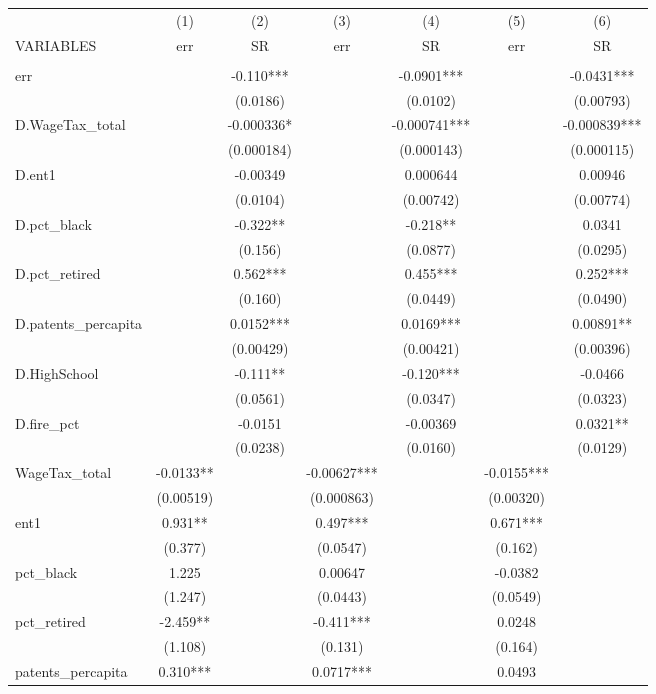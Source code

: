 \begin{tabular}{lcccccc} \hline
 & (1) & (2) & (3) & (4) & (5) & (6) \\
VARIABLES & err & SR & err & SR & err & SR \\ \hline
 &  &  &  &  &  &  \\
err &  & -0.110*** &  & -0.0901*** &  & -0.0431*** \\
 &  & (0.0186) &  & (0.0102) &  & (0.00793) \\
D.WageTax\_total &  & -0.000336* &  & -0.000741*** &  & -0.000839*** \\
 &  & (0.000184) &  & (0.000143) &  & (0.000115) \\
D.ent1 &  & -0.00349 &  & 0.000644 &  & 0.00946 \\
 &  & (0.0104) &  & (0.00742) &  & (0.00774) \\
D.pct\_black &  & -0.322** &  & -0.218** &  & 0.0341 \\
 &  & (0.156) &  & (0.0877) &  & (0.0295) \\
D.pct\_retired &  & 0.562*** &  & 0.455*** &  & 0.252*** \\
 &  & (0.160) &  & (0.0449) &  & (0.0490) \\
D.patents\_percapita &  & 0.0152*** &  & 0.0169*** &  & 0.00891** \\
 &  & (0.00429) &  & (0.00421) &  & (0.00396) \\
D.HighSchool &  & -0.111** &  & -0.120*** &  & -0.0466 \\
 &  & (0.0561) &  & (0.0347) &  & (0.0323) \\
D.fire\_pct &  & -0.0151 &  & -0.00369 &  & 0.0321** \\
 &  & (0.0238) &  & (0.0160) &  & (0.0129) \\
WageTax\_total & -0.0133** &  & -0.00627*** &  & -0.0155*** &  \\
 & (0.00519) &  & (0.000863) &  & (0.00320) &  \\
ent1 & 0.931** &  & 0.497*** &  & 0.671*** &  \\
 & (0.377) &  & (0.0547) &  & (0.162) &  \\
pct\_black & 1.225 &  & 0.00647 &  & -0.0382 &  \\
 & (1.247) &  & (0.0443) &  & (0.0549) &  \\
pct\_retired & -2.459** &  & -0.411*** &  & 0.0248 &  \\
 & (1.108) &  & (0.131) &  & (0.164) &  \\
patents\_percapita & 0.310*** &  & 0.0717*** &  & 0.0493 &  \\

\end{tabular}
